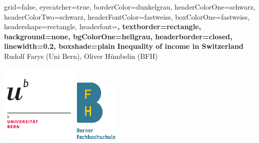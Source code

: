 \documentclass[a0paper,portrait]{baposter}
\begin{document}



\begin{poster}{
	grid=false,
	eyecatcher=true,
	borderColor=dunkelgrau,
	headerColorOne=schwarz,
	headerColorTwo=schwarz,
	headerFontColor=fastweiss,
	boxColorOne=fastweiss,
	headershape=rectangle,
	headerfont=\Large\sf\bf,
	textborder=rectangle,
	background=none,
	bgColorOne=hellgrau,
	headerborder=closed,
	linewidth=0.2,
  boxshade=plain
}
{
}
{\sf\bf\huge
	Inequality of income in Switzerland
}
{
	\vspace{1em}Rudolf Farys (Uni Bern), Oliver Hümbelin (BFH)
}
{

\includegraphics[height=10em]{Universitaet_Bern.pdf}
\includegraphics[height=8em]{BFH_Logo_A_de_100_4CU.eps}

}
\end{poster}
\end{document}
